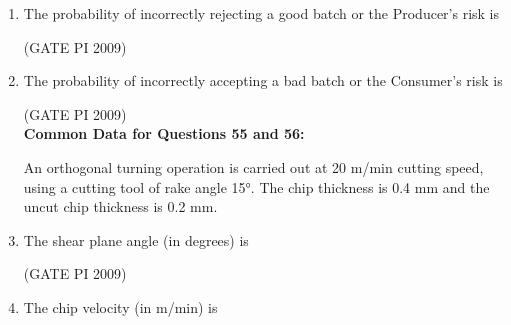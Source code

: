 \documentclass[journal,12pt,onecolumn]{IEEEtran}
\theoremstyle{remark}
\begin{document}
\begin{enumerate}
\item The probability of incorrectly rejecting a good batch or the Producer's risk is
\begin{enumerate}
\end{enumerate}
\hfill (GATE PI 2009)
\item The probability of incorrectly accepting a bad batch or the Consumer's risk is
\begin{enumerate}
\end{enumerate}
\hfill (GATE PI 2009) \\
\textbf{Common Data for Questions 55 and 56:}

An orthogonal turning operation is carried out at 20 m/min cutting speed, using a cutting tool of rake angle 15°. The chip thickness is 0.4 mm and the uncut chip thickness is 0.2 mm.


\item The shear plane angle (in degrees) is
\begin{enumerate}
\end{enumerate}
\hfill (GATE PI 2009)
\item The chip velocity (in m/min) is
\begin{enumerate}
\end{enumerate}
\end{enumerate}
\end{document}
